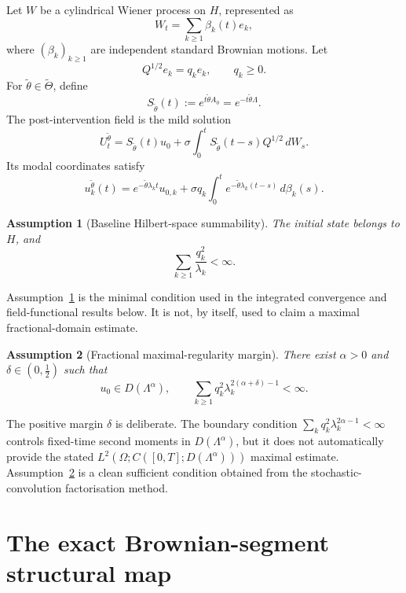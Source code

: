 \documentclass[11pt]{article}
\newtheorem{assumption}{Assumption}[section]
\theoremstyle{remark}
\newcommand{\1}{\mathbf 1}
\newcommand{\ThetaI}{\widetilde\Theta}
\newcommand{\Lambdaop}{\Lambda}
\begin{document}
Let \(W\) be a cylindrical Wiener process on \(H\), represented as
\[
  W_t=\sum_{k\ge1}\beta_k(t)e_k,
\]
where \((\beta_k)_{k\ge1}\) are independent standard Brownian motions.  Let
\[
  Q^{1/2}e_k=q_ke_k,\qquad q_k\ge0.
\]
For \(\widetilde\theta\in\ThetaI\), define
\[
  S_{\widetilde\theta}(t):=e^{t\widetilde\theta A_0}
  =e^{-t\widetilde\theta\Lambdaop}.
\]
The post-intervention field is the mild solution
\begin{equation}\label{eq:mild}
  U_t^{\widetilde\theta}
  =S_{\widetilde\theta}(t)u_0
   +\sigma\int_0^tS_{\widetilde\theta}(t-s)Q^{1/2}\,dW_s.
\end{equation}
Its modal coordinates satisfy
\begin{equation}\label{eq:mode}
  u_k^{\widetilde\theta}(t)
  =e^{-\widetilde\theta\lambda_kt}u_{0,k}
   +\sigma q_k\int_0^t e^{-\widetilde\theta\lambda_k(t-s)}\,d\beta_k(s).
\end{equation}

\begin{assumption}[Baseline Hilbert-space summability]\label{ass:baseline}
The initial state belongs to \(H\), and
\[
  \sum_{k\ge1}\frac{q_k^2}{\lambda_k}<\infty.
\]
\end{assumption}

Assumption~\ref{ass:baseline} is the minimal condition used in the integrated convergence and field-functional results below.  It is not, by itself, used to claim a maximal fractional-domain estimate.

\begin{assumption}[Fractional maximal-regularity margin]\label{ass:strong}
There exist \(\alpha>0\) and \(\delta\in(0,\tfrac12)\) such that
\[
  u_0\in D(\Lambdaop^\alpha),
  \qquad
  \sum_{k\ge1}q_k^2\lambda_k^{2(\alpha+\delta)-1}<\infty.
\]
\end{assumption}

The positive margin \(\delta\) is deliberate.  The boundary condition
\(\sum_kq_k^2\lambda_k^{2\alpha-1}<\infty\) controls fixed-time second moments in \(D(\Lambdaop^\alpha)\), but it does not automatically provide the stated \(L^2(\Omega;C([0,T];D(\Lambdaop^\alpha)))\) maximal estimate.  Assumption~\ref{ass:strong} is a clean sufficient condition obtained from the stochastic-convolution factorisation method.

\section{The exact Brownian-segment structural map}
\end{document}
